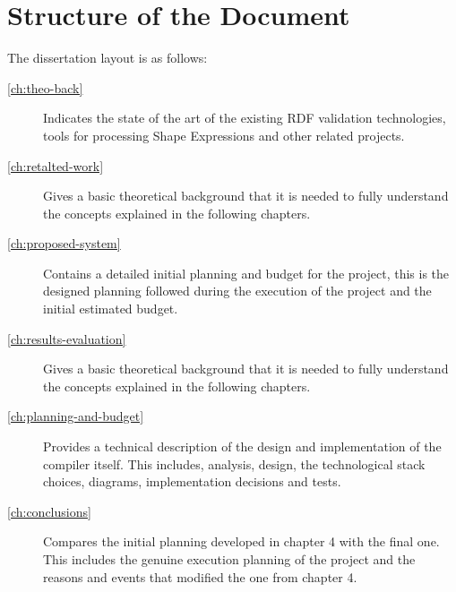 
\section{Structure of the Document}
\label{sec:intro-structure}
The dissertation layout is as follows:
\bigskip

\begin{description}
  \item[\cref{ch:theo-back}] Indicates the state of the art of the existing RDF validation technologies, tools for processing Shape
  Expressions and other related projects.
	\item[\cref{ch:retalted-work}] Gives a basic theoretical background that it is needed to fully understand the concepts explained in the
  following chapters.
  \item[\cref{ch:proposed-system}] Contains a detailed initial planning and budget for the project, this is the designed planning followed
  during the execution of the project and the initial estimated budget.
  \item[\cref{ch:results-evaluation}] Gives a basic theoretical background that it is needed to fully understand the concepts explained in the
  following chapters.
  \item[\cref{ch:planning-and-budget}] Provides a technical description of the design and implementation of the compiler itself. This includes,
  analysis, design, the technological stack choices, diagrams, implementation decisions and tests.
  \item[\cref{ch:conclusions}] Compares the initial planning developed in chapter 4 with the final one. This includes the genuine execution
  planning of the project and the reasons and events that modified the one from chapter 4.
\end{description}